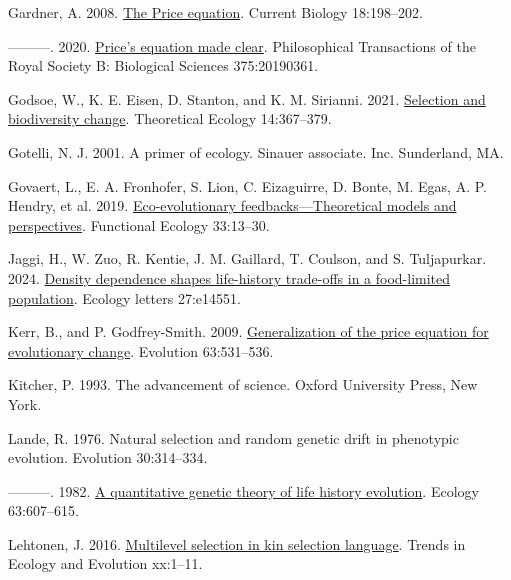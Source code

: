 \documentclass[
]{article}
\newlength{\cslhangindent}
\newenvironment{CSLReferences}[2] %
 {\begin{list}{}{%
  \setlength{\itemindent}{0pt}
  \setlength{\leftmargin}{0pt}
  \setlength{\parsep}{0pt}
  \ifodd #1
   \setlength{\leftmargin}{\cslhangindent}
   \setlength{\itemindent}{-1\cslhangindent}
  \fi
  \setlength{\itemsep}{#2\baselineskip}}}
 {\end{list}}
\begin{document}
\begin{CSLReferences}{1}{0}
Gardner, A. 2008. \href{https://doi.org/10.1016/j.cub.2008.01.005}{{The
Price equation}}. Current Biology 18:198--202.

---------. 2020. \href{https://doi.org/10.1098/rstb.2019.0361}{{Price's
equation made clear}}. Philosophical Transactions of the Royal Society
B: Biological Sciences 375:20190361.

Godsoe, W., K. E. Eisen, D. Stanton, and K. M. Sirianni. 2021.
\href{https://doi.org/10.1007/s12080-020-00478-3}{Selection and
biodiversity change}. Theoretical Ecology 14:367--379.

Gotelli, N. J. 2001. A primer of ecology. Sinauer associate. Inc.
Sunderland, MA.

Govaert, L., E. A. Fronhofer, S. Lion, C. Eizaguirre, D. Bonte, M. Egas,
A. P. Hendry, et al. 2019.
\href{https://doi.org/10.1111/1365-2435.13241}{{Eco-evolutionary
feedbacks---Theoretical models and perspectives}}. Functional Ecology
33:13--30.

Jaggi, H., W. Zuo, R. Kentie, J. M. Gaillard, T. Coulson, and S.
Tuljapurkar. 2024. \href{https://doi.org/10.1111/ele.14551}{Density
dependence shapes life-history trade-offs in a food-limited population}.
Ecology letters 27:e14551.

Kerr, B., and P. Godfrey-Smith. 2009.
\href{https://doi.org/10.1111/j.1558-5646.2008.00570.x}{{Generalization
of the price equation for evolutionary change}}. Evolution 63:531--536.

Kitcher, P. 1993. {The advancement of science}. Oxford University Press,
New York.

Lande, R. 1976. Natural selection and random genetic drift in phenotypic
evolution. Evolution 30:314--334.

---------. 1982. \href{https://doi.org/10.2307/1936778}{{A quantitative
genetic theory of life history evolution}}. Ecology 63:607--615.

Lehtonen, J. 2016.
\href{https://doi.org/10.1016/j.tree.2016.07.006}{{Multilevel selection
in kin selection language}}. Trends in Ecology and Evolution xx:1--11.


\end{CSLReferences}
\end{document}
